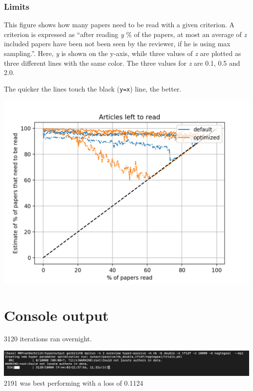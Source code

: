 \documentclass[
]{book}
\begin{document}
\pagebreak

\hypertarget{limits}{%
\subsubsection{Limits}\label{limits}}

This figure shows how many papers need to be read with a given criterion. A criterion is expressed
as ``after reading \emph{y} \% of the papers, at most an average of \emph{z} included papers have been not been
seen by the reviewer, if he is using max sampling.''. Here, \emph{y} is shown on the y-axis, while
three values of \emph{z} are plotted as three different lines with the same color. The three values for
\emph{z} are 0.1, 0.5 and 2.0.

The quicker the lines touch the black (\texttt{y=x}) line, the better.

\includegraphics[width=17.78in]{figs/myfirstsim/Figure_3}

\pagebreak

\hypertarget{console-output}{%
\section{Console output}\label{console-output}}

3120 iterations ran overnight.

\includegraphics[width=26.42in]{figs/myfirstsim/computation}
2191 was best performing with a loss of 0.1124
\end{document}
